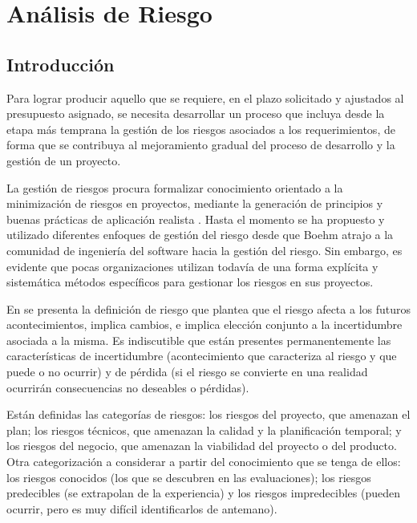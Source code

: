 	\newpage
	
	\section{Análisis de Riesgo}
		\subsection{Introducción}
        Para lograr producir aquello que se requiere, en el plazo solicitado y ajustados al presupuesto asignado, se necesita desarrollar
        un proceso que incluya desde la etapa más temprana la gestión de los riesgos asociados a los requerimientos, de forma que se contribuya al
        mejoramiento gradual del proceso de desarrollo y la gestión de un proyecto.
		\par
        La gestión de riesgos procura formalizar conocimiento orientado a la minimización de riesgos en proyectos, mediante la
        generación de principios y buenas prácticas de aplicación realista \cite{etiqueta_riegos1}. Hasta el momento se ha propuesto
        y utilizado diferentes enfoques de gestión del riesgo desde que Boehm \cite{etiqueta_riegos2} atrajo a la comunidad de ingeniería del
        software hacia la gestión del riesgo. Sin embargo, es evidente que pocas organizaciones utilizan todavía de una forma explícita y sistemática
        métodos específicos para gestionar los riesgos en sus proyectos.
		\par
        En \cite{etiqueta_riegos3} se presenta la definición de riesgo que plantea que el riesgo afecta a los futuros acontecimientos, implica
        cambios, e implica elección conjunto a la incertidumbre asociada a la misma. Es indiscutible que están presentes permanentemente las características de
        incertidumbre (acontecimiento que caracteriza al riesgo y que puede o no ocurrir) y de pérdida (si el riesgo se convierte en una realidad
        ocurrirán consecuencias no deseables o pérdidas).
		\par
		Están definidas las categorías de riesgos: los riesgos del proyecto, que amenazan el plan; los riesgos técnicos, que amenazan la calidad y la
		planificación temporal; y los riesgos del negocio, que amenazan la viabilidad del proyecto o del producto. Otra categorización a considerar a
		partir del conocimiento que se tenga de ellos: los riesgos conocidos (los que se descubren en las evaluaciones); los riesgos predecibles (se
		extrapolan de la experiencia) y los riesgos impredecibles (pueden ocurrir, pero es muy difícil identificarlos de antemano).
